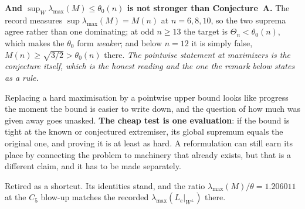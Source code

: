 \textbf{And $\sup_W\lambda_{\max}(M)\le\theta_0(n)$ is not stronger than Conjecture~A.} The record measures $\sup\lambda_{\max}(M)=M(n)$ at $n=6,8,10$, so the two suprema agree rather than one dominating; at odd $n\ge13$ the target is $\Theta_n<\theta_0(n)$, which makes the $\theta_0$ form \emph{weaker}; and below $n=12$ it is simply false, $M(n)\ge\sqrt{3/2}>\theta_0(n)$ there. \emph{The pointwise statement at maximizers is the conjecture itself, which is the honest reading and the one the remark below states as a rule.}

\begin{remarkstar}
Replacing a hard maximisation by a pointwise upper bound looks like progress the moment the bound is easier to write down, and the question of how much was given away goes unasked. \textbf{The cheap test is one evaluation}: if the bound is tight at the known or conjectured extremiser, its global supremum equals the original one, and proving it is at least as hard. A reformulation can still earn its place by connecting the problem to machinery that already exists, but that is a different claim, and it has to be made separately.
\end{remarkstar}

Retired as a shortcut. Its identities stand, and the ratio $\lambda_{\max}(M)/\theta=1.206011$ at the $C_5$ blow-up matches the recorded $\lambda_{\max}(L_e|_{W^\perp})$ there.


